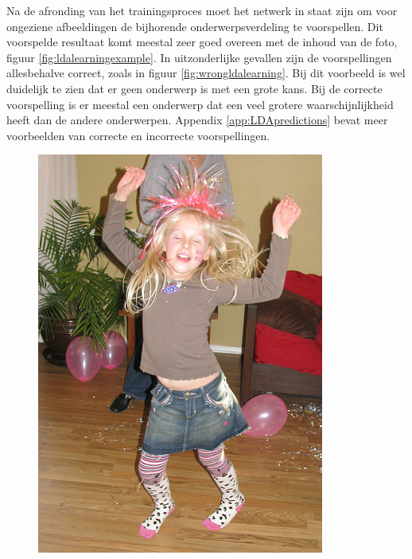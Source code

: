 Na de afronding van het trainingsproces moet het netwerk in staat zijn om voor ongeziene afbeeldingen de bijhorende onderwerpsverdeling te voorspellen. Dit voorspelde resultaat komt meestal zeer goed overeen met de inhoud van de foto, figuur \ref{fig:ldalearningexample}. In uitzonderlijke gevallen zijn de voorspellingen allesbehalve correct, zoals in figuur \ref{fig:wrongldalearning}. Bij dit voorbeeld is wel duidelijk te zien dat er geen onderwerp is met een grote kans. Bij de correcte voorspelling is er meestal een onderwerp dat een veel grotere waarschijnlijkheid heeft dan de andere onderwerpen. Appendix \ref{app:LDApredictions} bevat meer voorbeelden van correcte en incorrecte voorspellingen.

\begin{figure}[h]
    \centering
    \begin{minipage}[t]{.5\linewidth}
    \centering
    \vspace{0pt}
    \includegraphics[width=\textwidth]{Images/LDA/2282260240.jpg}

\end{minipage}
\end{figure}
